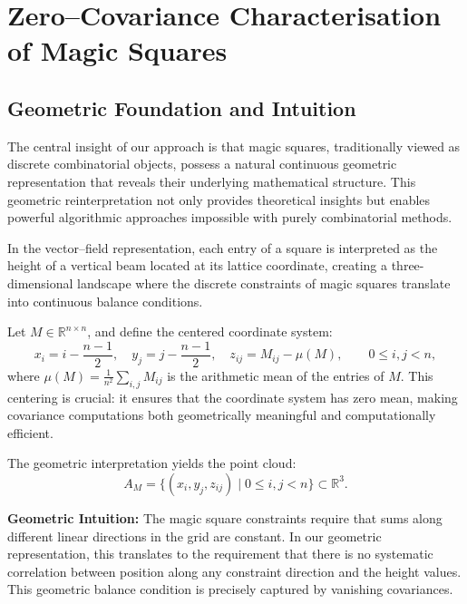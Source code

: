 \section{Zero--Covariance Characterisation of Magic Squares}\label{sec:covariance-proof}

\subsection{Geometric Foundation and Intuition}

The central insight of our approach is that magic squares, traditionally viewed as discrete combinatorial objects, possess a natural continuous geometric representation that reveals their underlying mathematical structure. This geometric reinterpretation not only provides theoretical insights but enables powerful algorithmic approaches impossible with purely combinatorial methods.

In the vector--field representation, each entry of a square is interpreted as the height of a vertical beam located at its lattice coordinate, creating a three-dimensional landscape where the discrete constraints of magic squares translate into continuous balance conditions.

Let $M\in\mathbb{R}^{n\times n}$, and define the centered coordinate system:
\[
    x_i = i-\frac{n-1}{2},\quad y_j = j-\frac{n-1}{2},\quad z_{ij}=M_{ij}-\mu(M),\qquad 0\le i,j<n,
\]
where $\mu(M) = \frac{1}{n^2}\sum_{i,j} M_{ij}$ is the arithmetic mean of the entries of $M$. This centering is crucial: it ensures that the coordinate system has zero mean, making covariance computations both geometrically meaningful and computationally efficient.

The geometric interpretation yields the point cloud:
\[
    A_M=\{(x_i,y_j,z_{ij})\mid 0\le i,j<n\}\subset \mathbb{R}^3.
\]

\textbf{Geometric Intuition:} The magic square constraints require that sums along different linear directions in the grid are constant. In our geometric representation, this translates to the requirement that there is no systematic correlation between position along any constraint direction and the height values. This geometric balance condition is precisely captured by vanishing covariances.

